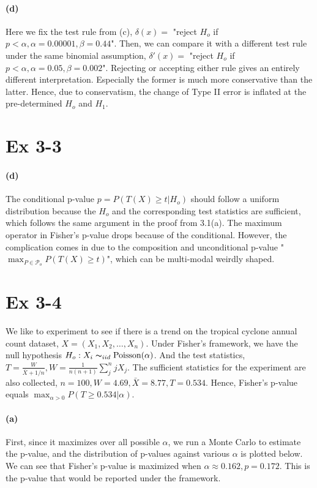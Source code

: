 \documentclass[11pt, letterpaper]{article}
\begin{document}
\paragraph{(d)}
Here we fix the test rule from (c), $\delta(x) = $ "reject $H_o$ if $p < \alpha, \alpha=0.00001, \beta=0.44$". Then, we can compare it with a different test rule under the same binomial assumption, $\delta'(x) = $ "reject $H_o$ if $p < \alpha, \alpha=0.05, \beta=0.002$". Rejecting or accepting either rule gives an entirely different interpretation. Especially the former is much more conservative than the latter. Hence, due to conservatism, the change of Type II error is inflated at the pre-determined $H_o$ and $H_1$. 


\section{Ex 3-3}
\paragraph{(d)}
The conditional p-value $p = P(T(X) \ge t|H_o)$ should follow a uniform distribution because the $H_o$ and the corresponding test statistics are sufficient, which follows the same argument in the proof from 3.1(a). The maximum operator in Fisher's p-value drops because of the conditional. However, the complication comes in due to the composition and unconditional p-value "$\mathop{\max}_{P\in \mathcal{P}_o} P(T(X) \ge t)$", which can be multi-modal weirdly shaped.

\newpage
\section{Ex 3-4}
We like to experiment to see if there is a trend on the tropical cyclone annual count dataset, $X =(X_1, X_2, \dots, X_n)$. Under Fisher's framework, we have the null hypothesis $H_o: X_i \thicksim_{iid} \text{Poisson}(\alpha)$. And the test statistics, $T=\frac{W}{\bar{X}+1/n}, W=\frac{1}{n(n+1)}\sum_j^n jX_j$. The sufficient statistics for the experiment are also collected, $n=100, W = 4.69, \bar{X}=8.77, T=0.534$. Hence, Fisher's p-value equals $\max_{\alpha>0} P(T\ge 0.534|\alpha)$.

\paragraph{(a)}
First, since it maximizes over all possible $\alpha$, we run a Monte Carlo to estimate the p-value, and the distribution of p-values against various $\alpha$ is plotted below. We can see that Fisher's p-value is maximized when $\alpha \approx 0.162, p = 0.172$. This is the p-value that would be reported under the framework.
\end{document}
